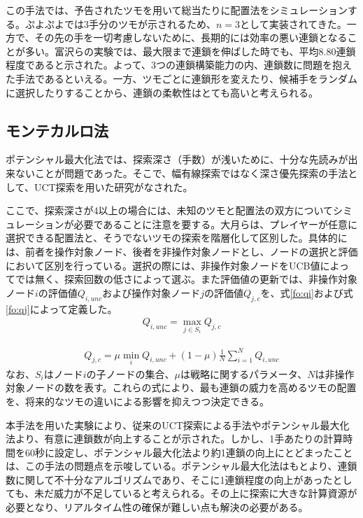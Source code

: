\documentclass[12pt]{jarticle}
\begin{document}
この手法では、予告されたツモを用いて総当たりに配置法をシミュレーションする。ぷよぷよでは3手分のツモが示されるため、$n=3$として実装されてきた。一方で、その先の手を一切考慮しないために、長期的には効率の悪い連鎖となることが多い。富沢ら\cite{puyo_temp}の実験では、最大限まで連鎖を伸ばした時でも、平均8.80連鎖程度であると示された。よって、3つの連鎖構築能力の内、連鎖数に問題を抱えた手法であるといえる。一方、ツモごとに連鎖形を変えたり、候補手をランダムに選択したりすることから、連鎖の柔軟性はとても高いと考えられる。

\subsection{モンテカルロ法}
ポテンシャル最大化法では、探索深さ（手数）が浅いために、十分な先読みが出来ないことが問題であった。そこで、幅有線探索ではなく深さ優先探索の手法として、UCT探索を用いた研究がなされた\cite{puyo_monte}。

ここで、探索深さが4以上の場合には、未知のツモと配置法の双方についてシミュレーションが必要であることに注意を要する。大月らは、プレイヤーが任意に選択できる配置法と、そうでないツモの探索を階層化して区別した。具体的には、前者を操作対象ノード、後者を非操作対象ノードとし、ノードの選択と評価において区別を行っている。選択の際には、非操作対象ノードをUCB値によってでは無く、探索回数の低さによって選ぶ。また評価値の更新では、非操作対象ノード$i$の評価値$Q_{i,unc}$および操作対象ノード$j$の評価値$Q_{j,c}$を、式\ref{fo:qi}および式\ref{fo:qj}によって定義した。
\begin{eqnarray} \label{fo:qi}
  Q_{i,unc} = \max_{j\in S_i}Q_{j,c}
\end{eqnarray}

\begin{eqnarray} \label{fo:qj}
  Q_{j,c} = \mu \min_{i} Q_{i,unc}+(1-\mu)\frac{1}{N} \sum_{i=1}^{N} Q_{i,unc}
\end{eqnarray}
なお、$S_i$はノード$i$の子ノードの集合、$\mu$は戦略に関するパラメータ、$N$は非操作対象ノードの数を表す。これらの式により、最も連鎖の威力を高めるツモの配置を、将来的なツモの違いによる影響を抑えつつ決定できる。

本手法を用いた実験により、従来のUCT探索による手法やポテンシャル最大化法より、有意に連鎖数が向上することが示された。しかし、1手あたりの計算時間を60秒に設定し、ポテンシャル最大化法より約1連鎖の向上にとどまったことは、この手法の問題点を示唆している。ポテンシャル最大化法はもとより、連鎖数に関して不十分なアルゴリズムであり、そこに1連鎖程度の向上があったとしても、未だ威力が不足していると考えられる。その上に探索に大きな計算資源が必要となり、リアルタイム性の確保が難しい点も解決の必要がある。
\end{document}
